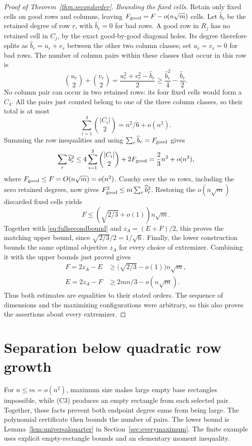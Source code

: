 \documentclass[11pt]{article}
\begin{document}
\begin{proof}[Proof of Theorem~\ref{thm:secondorder}]
\smallskip
\noindent\emph{Bounding the fixed cells.}
Retain only fixed cells on good rows and columns, leaving
$F_{\rm good}=F-o(n\sqrt m)$ cells. Let $\widehat b_r$ be the retained
degree of row $r$, with $\widehat b_r=0$ for bad rows. A good row in
$R_j$ has no retained cell in $C_j$, by the exact good-by-good diagonal
holes. Its degree therefore splits as $\widehat b_r=u_r+v_r$ between
the other two column classes; set $u_r=v_r=0$ for bad rows.
The number of column pairs within these
classes that occur in this row is
\[
 \binom{u_r}{2}+\binom{v_r}{2}
 =\frac{u_r^2+v_r^2-\widehat b_r}{2}
 \ge\frac{\widehat b_r^2}{4}-\frac{\widehat b_r}{2}.
\]
No column pair can occur in two retained rows: its four fixed cells
would form a $C_4$. All the pairs just counted belong to one of the
three column classes, so their total is at most
\[
 \sum_{i=1}^3\binom{|C_i|}{2}=n^2/6+o(n^2).
\]
Summing the row inequalities and using
$\sum_r\widehat b_r=F_{\rm good}$ gives
\[
 \sum_r\widehat b_r^2
 \le4\sum_{i=1}^3\binom{|C_i|}{2}+2F_{\rm good}
 =\frac23n^2+o(n^2),
\]
where $F_{\rm good}\le F=O(n\sqrt m)=o(n^2)$.
Cauchy over the $m$ rows, including the zero retained degrees, now gives
$F_{\rm good}^2\le m\sum_r\widehat b_r^2$.
Restoring the $o(n\sqrt m)$ discarded fixed cells yields
\[
 F\le\left(\sqrt{2/3}+o(1)\right)n\sqrt m.
\]
Together with \eqref{eq:fullsecondbound} and $z_A=(E+F)/2$, this
proves the matching upper bound, since $\sqrt{2/3}/2=1/\sqrt6$.
Finally, the lower construction bounds the same optimal objective
$z_A$ for every choice of extremizer. Combining it with the upper
bounds just proved gives
\[
 \begin{aligned}
 F=2z_A-E&\ge\bigl(\sqrt{2/3}-o(1)\bigr)n\sqrt m,\\
 E=2z_A-F&\ge2mn/3-o(n\sqrt m).
 \end{aligned}
\]
Thus both estimates are equalities to their stated orders. The sequence
of dimensions and the maximizing configurations were arbitrary, so this
also proves the assertions about every extremizer.
\end{proof}

\section{Separation below quadratic row growth}\label{sec:generalsquare}
For $n\le m=o(n^2)$, maximum size makes large empty base rectangles
impossible, while (C3) produces an empty rectangle from each selected
pair. Together, these facts prevent both endpoint degree sums from being
large. The polynomial certificate then bounds the number of pairs.
The lower bound is Lemma~\ref{lem:universalquarter} in
Section~\ref{sec:everymaximum}. The finite example uses explicit
empty-rectangle bounds and an elementary moment inequality.
\end{document}
